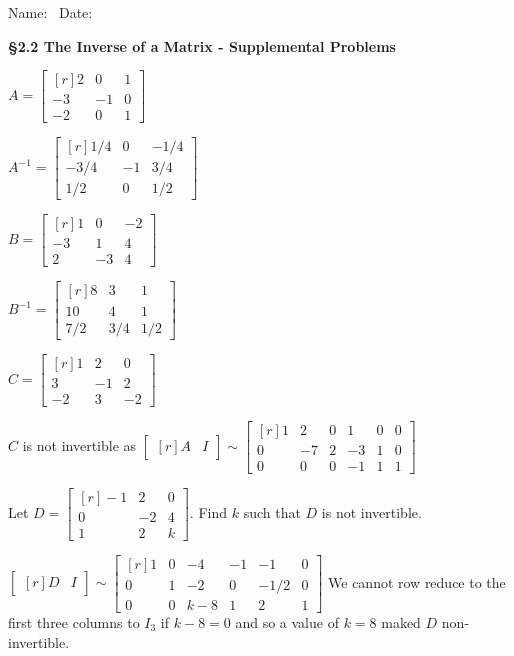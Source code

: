 \documentclass[11pt,answers]{exam} %
\newcommand{\mat}[1]{\begin{bmatrix*}[r] #1 \end{bmatrix*}}
\begin{document}
\flushleft
Name:\ \makebox[4in]{\hrulefill} \hspace{1in} Date:\ \makebox[1in]{\hrulefill}
\begin{center}
    \textbf{\S 2.2 The Inverse of a Matrix - Supplemental Problems}
\end{center}

\begin{questions}
    \question $A = \mat{2 & 0 & 1 \\ -3 & -1 & 0 \\ -2 & 0 & 1}$
    \begin{solution}
        $A^{-1} = \mat{ 1/4 & 0 & -1/4 \\ -3/4 & -1 & 3/4 \\ 1/2 & 0 & 1/2}$
    \end{solution}

    \question $B = \mat{1 & 0 & -2 \\ -3 & 1 & 4 \\ 2 & -3 & 4}$
    \begin{solution}
        $B^{-1} = \mat{8 & 3 & 1 \\ 10 & 4 & 1 \\ 7/2 & 3/4 & 1/2}$
    \end{solution}

    \question $C = \mat{1 & 2 & 0 \\ 3 & -1 & 2 \\ -2 & 3 & -2}$
    \begin{solution}
        $C$ is not invertible as $\mat{A & I} \sim \mat{1 & 2 & 0 & 1 & 0 & 0 \\ 0 & -7 & 2 & -3 & 1 & 0 \\ 0 & 0 & 0 & -1 & 1 & 1}$
    \end{solution}

    \question Let $D = \mat{-1 & 2 & 0 \\ 0 & -2 & 4 \\ 1 & 2 & k}$. Find $k$ such that $D$ is not invertible.
    \begin{solution}
        $\mat{D & I} \sim \mat{1 & 0 & -4 & -1 & -1 & 0 \\ 0 & 1 & -2 & 0 & -1/2 & 0 \\ 0 & 0 & k-8 & 1 & 2 & 1}$ \newline 
        We cannot row reduce to the first three columns to $I_3$ if $k-8 = 0$ and so a value of $k=8$ maked $D$ non-invertible.
    \end{solution}
\end{questions}
\end{document}
